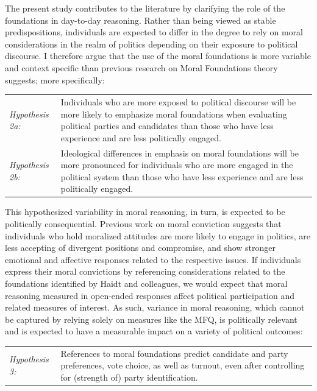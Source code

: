 \documentclass[12pt]{article}
\begin{document}
The present study contributes to the literature by clarifying the role of the foundations in day-to-day reasoning. Rather than being viewed as stable predispositions, individuals are expected to differ in the degree to rely on moral considerations in the realm of politics depending on their exposure to political discourse. I therefore argue that the use of the moral foundations is more variable and context specific than previous research on Moral Foundations theory suggests; more specifically:

\vspace{0.3cm}
\begin{tabular}{lp{12cm}}
\textsl{Hypothesis 2a:} & Individuals who are more exposed to political discourse will be more likely to emphasize moral foundations when evaluating political parties and candidates than those who have less experience and are less politically engaged. \\
\textsl{Hypothesis 2b:} & Ideological differences in emphasis on moral foundations will be more pronounced for individuals who are more engaged in the political system than those who have less experience and are less politically engaged.
\end{tabular}
\vspace{0.5cm}

This hypothesized variability in moral reasoning, in turn, is expected to be politically consequential. Previous work on moral conviction suggests that individuals who hold moralized attitudes are more likely to engage in politics, are less accepting of divergent positions and compromise, and show stronger emotional and affective responses related to the respective issues. If individuals express their moral convictions by referencing considerations related to the foundations identified by Haidt and colleagues, we would expect that moral reasoning measured in open-ended responses affect political participation and related measures of interest. As such, variance in moral reasoning, which cannot be captured by relying solely on measures like the MFQ, is politically relevant and is expected to have a measurable impact on a variety of political outcomes:

\vspace{0.3cm}
\begin{tabular}{lp{12cm}}
\textsl{Hypothesis 3:} & References to moral foundations predict candidate and party preferences, vote choice, as well as turnout, even after controlling for (strength of) party identification.
\end{tabular}
\vspace{0.5cm}
\end{document}

